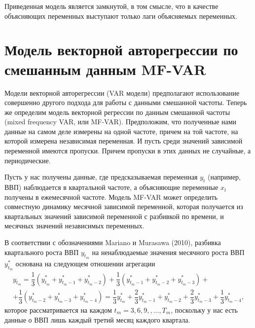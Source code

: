 \documentclass[a4paper, 14pt]{extreport}
\numberwithin{equation}{subsection}
\numberwithin{equation}{section}
\begin{document}
	Приведенная модель является замкнутой, в том смысле, что в качестве объясняющих переменных выступают только лаги объясняемых переменных. 
	\section{Модель векторной авторегрессии по смешанным данным MF-VAR} \label{sec:mfvar}
	Модели векторной авторегрессии (VAR модели) предполагают использование совершенно другого подхода для работы с данными смешанной частоты. Теперь же определим модель векторной регрессии по данным смешанной частоты (mixed frequency VAR, или MF-VAR). Предположим, что полученные нами данные на самом деле измерены на одной частоте, причем на той частоте, на которой измерена независимая переменная. И пусть среди значений зависимой переменной имеются пропуски. Причем пропуски в этих данных не случайные, а периодические.
	
	Пусть у нас получены данные, где предсказываемая переменная $y_t$ (например, ВВП) наблюдается в квартальной частоте, а объясняющие переменные $x_t$ получены в ежемесячной частоте. Модель MF-VAR может определить совместную динамику месячной зависимой переменной,
	которая получается из квартальных значений зависимой переменной с разбивкой по времени, и месячных значений независимых переменных.
	
	В соответствии с обозначениями Mariano и Murasawa (2010), разбивка квартального роста ВВП $y_{t_m}$ на ненаблюдаемые значения месячного роста ВВП $y^*_{t_m}$ основана на следующем отношении агрегации
	\begin{multline}
			y_{t_m} = \dfrac{1}{3}(y^*_{t_m} + y^*_{t_m-1} + y^*_{t_m-2}) + \dfrac{1}{3}(y^*_{t_m-1} + y^*_{t_m-2} + y^*_{t_m-3}) +\\+ \dfrac{1}{3}(y^*_{t_m-2} + y^*_{t_m-3} + y^*_{t_m-4}) = \dfrac{1}{3} y^*_{t_m} + \dfrac{2}{3} y^*_{t_m-1} + y^*_{t_m-2} + \dfrac{2}{3} y^*_{t_m-3} + \dfrac{1}{3} y^*_{t_m-4},
	\end{multline}
	которое рассматривается на каждом $t_m = 3,6,9,,\ldots, T_m$, поскольку у нас есть данные о ВВП лишь каждый третий месяц каждого квартала. 
	
\end{document}
